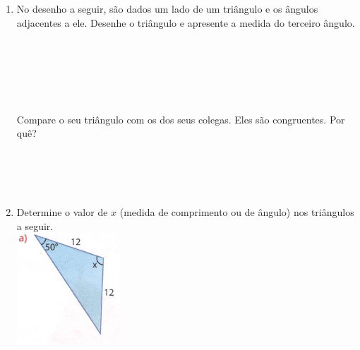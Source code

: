 \documentclass[a4paper,14pt]{article}
\begin{document}
\begin{multicols}{2}
\begin{enumerate}
			\item No desenho a seguir, são dados um lado de um triângulo e os ângulos adjacentes a ele. Desenhe o triângulo e apresente a medida do terceiro ângulo. \\\\\\\\\\\\\\
			Compare o seu triângulo com os dos seus colegas. Eles são congruentes. Por quê? \\\\\\\\\
			\item Determine o valor de $x$ (medida de comprimento ou de ângulo) nos triângulos a seguir. \\
			\includegraphics[width=1\linewidth]{6FMA124_imagens/imagem1}

\end{enumerate}
\end{multicols}
\end{document}
